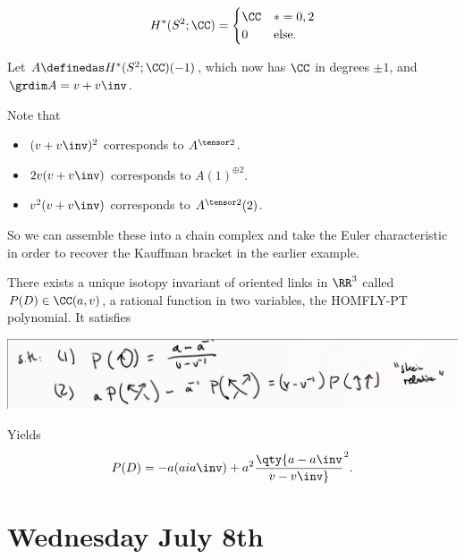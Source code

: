 \begin{example}[Important]

\begin{align*}  
H^*(S^2; \CC)
=
\begin{cases}
\CC & * = 0, 2 \\
0 & \text{else}.
\end{cases}
\end{align*}

Let \(A\definedas H^*(S^2; \CC)(-1)\), which now has \(\CC\) in degrees
\(\pm 1\), and \(\grdim A = v + v\inv\).

Note that

\begin{itemize}
\tightlist
\item
  \((v+v\inv)^2\) corresponds to \(A^{\tensor 2}\).
\item
  \(2v(v+v\inv)\) corresponds to \(A(1)^{\oplus 2}\).
\item
  \(v^2(v+v\inv)\) corresponds to \(A^{\tensor 2}(2)\).
\end{itemize}

So we can assemble these into a chain complex and take the Euler
characteristic in order to recover the Kauffman bracket in the earlier
example.

\end{example}

\begin{theorem}[?]

There exists a unique isotopy invariant of oriented links in \(\RR^3\)
called \(P(D) \in \CC(a, v)\), a rational function in two variables, the
HOMFLY-PT polynomial. It satisfies

\includegraphics{figures/image_2020-07-07-11-56-40.png}

\end{theorem}

\begin{example}

Yields
\begin{align*}
P(D) = -a(aia\inv) + a^2 \qty{a-a\inv \over v-v\inv}^2
.\end{align*}

\end{example}

\hypertarget{wednesday-july-8th}{%
\section{Wednesday July 8th}\label{wednesday-july-8th}}

